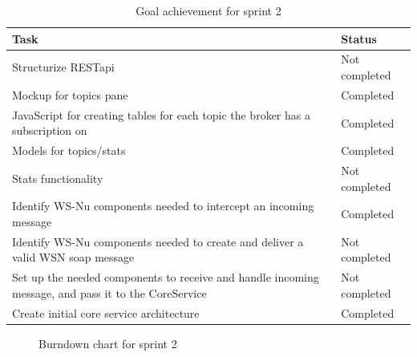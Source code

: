 \begin{table}[ht!]
\small
\centering
\begin{tabular}{ | p{10cm} | p{2cm} |}
\hline
\rowcolor{lightgray}
 \textbf{Task} & \textbf{Status} \\
\hline
\rowcolor{orange!40}
Structurize RESTapi & Not completed \\
\rowcolor{green!30}
Mockup for topics pane & Completed \\
\rowcolor{green!30}
JavaScript for creating tables for each topic the broker has a subscription on & Completed \\
\rowcolor{green!30}
Models for topics/stats & Completed \\
\rowcolor{orange!40}
Stats functionality	& Not completed \\
\rowcolor{green!30}
Identify WS-Nu components needed to intercept an incoming message & Completed \\
\rowcolor{orange!40}
Identify WS-Nu components needed to create and deliver a valid WSN soap message & Not completed \\
\rowcolor{orange!40}
Set up the needed components to receive and handle incoming message, and pass it to the CoreService	& Not completed \\
\rowcolor{green!30}
Create initial core service architecture & Completed \\
\hline
\end{tabular}
\caption{Goal achievement for sprint 2}
\label{tab:sprint 2, goals}
\end{table}


\begin{center}
  \begin{figure}[ht!]
    \caption{Burndown chart for sprint 2}
    \label{fig:sprint 2, burndown}
  \end{figure}
\end{center}

